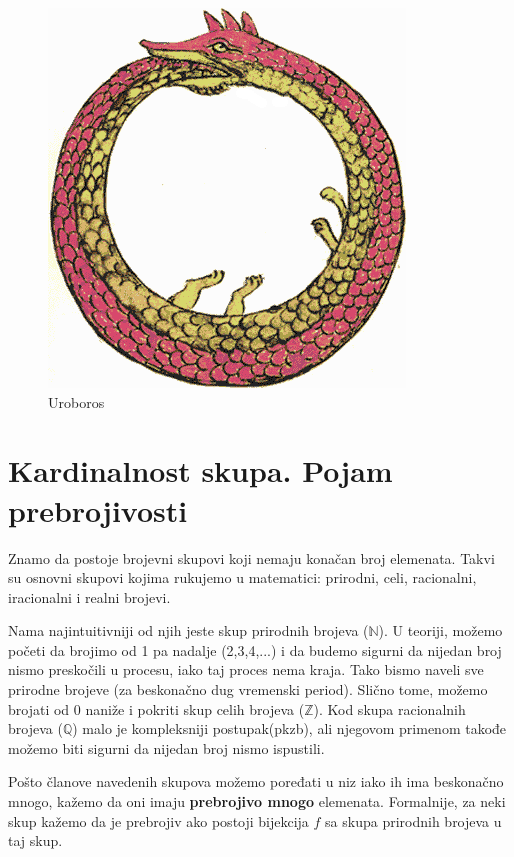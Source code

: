 \documentclass[a4paper]{article}
\begin{document}
\begin{figure}[ht!]
\begin{center}
\includegraphics[scale=0.4]{Uroboros.png}
\end{center}
\caption{Uroboros}
\label{fig:Uroboros}
\end{figure}

\newpage

\section{Kardinalnost skupa. Pojam prebrojivosti}
\label{poglavlje:Kardinalnost. Pojam prebrojivosti}

Znamo da postoje brojevni skupovi koji nemaju konačan broj elemenata. Takvi su osnovni skupovi kojima rukujemo u matematici: prirodni, celi, racionalni, iracionalni i realni brojevi.

Nama najintuitivniji od njih jeste skup prirodnih brojeva ($\mathbb{N}$). U teoriji, možemo početi da brojimo od 1 pa nadalje (2,3,4,...) i da budemo sigurni da nijedan broj nismo preskočili u procesu, iako taj proces nema kraja. Tako bismo naveli sve prirodne brojeve (za beskonačno dug vremenski period). Slično tome, možemo brojati od 0 naniže i pokriti skup celih brojeva ($\mathbb{Z}$). Kod skupa racionalnih brojeva ($\mathbb{Q}$) malo je kompleksniji postupak(pkzb), ali njegovom primenom takođe možemo biti sigurni da nijedan broj nismo ispustili.

Pošto članove navedenih skupova možemo poređati u niz iako ih ima beskonačno mnogo, kažemo da oni imaju \textbf{prebrojivo mnogo} elemenata. Formalnije, za neki skup kažemo da je prebrojiv ako postoji bijekcija $f$ sa skupa prirodnih brojeva u taj skup\cite{klaric2016}.
\end{document}
